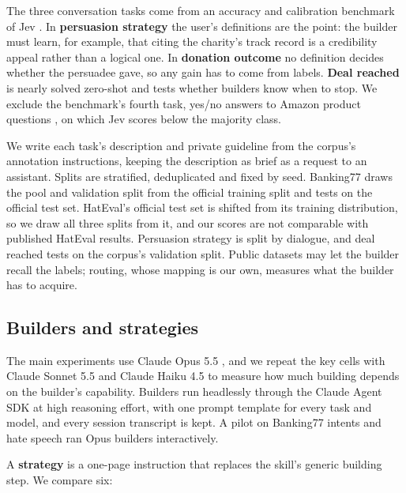 \documentclass[11pt]{article}
\begin{document}
The three conversation tasks come from an accuracy and calibration benchmark of Jev \citep{typesafe2026b}. In \textbf{persuasion strategy} the user's definitions are the point: the builder must learn, for example, that citing the charity's track record is a credibility appeal rather than a logical one. In \textbf{donation outcome} no definition decides whether the persuadee gave, so any gain has to come from labels. \textbf{Deal reached} is nearly solved zero-shot and tests whether builders know when to stop. We exclude the benchmark's fourth task, yes/no answers to Amazon product questions \citep{mcauley2016addressing}, on which Jev scores below the majority class.

We write each task's description and private guideline from the corpus's annotation instructions, keeping the description as brief as a request to an assistant. Splits are stratified, deduplicated and fixed by seed. Banking77 draws the pool and validation split from the official training split and tests on the official test set. HatEval's official test set is shifted from its training distribution, so we draw all three splits from it, and our scores are not comparable with published HatEval results. Persuasion strategy is split by dialogue, and deal reached tests on the corpus's validation split. Public datasets may let the builder recall the labels; routing, whose mapping is our own, measures what the builder has to acquire.

\subsection{Builders and strategies}

The main experiments use Claude Opus 5.5 \citep{anthropic2026}, and we repeat the key cells with Claude Sonnet 5.5 and Claude Haiku 4.5 to measure how much building depends on the builder's capability. Builders run headlessly through the Claude Agent SDK at high reasoning effort, with one prompt template for every task and model, and every session transcript is kept. A pilot on Banking77 intents and hate speech ran Opus builders interactively.

A \textbf{strategy} is a one-page instruction that replaces the skill's generic building step. We compare six:
\end{document}
